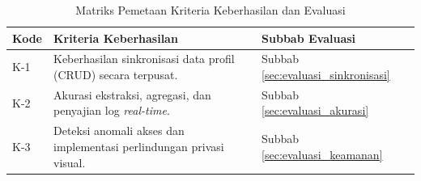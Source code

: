 \begin{table}[t]
\centering
\caption{Matriks Pemetaan Kriteria Keberhasilan dan Evaluasi}
\label{tab:mapping_success}
\begin{tabular}{|l|p{8cm}|l|}
\hline
\textbf{Kode} & \textbf{Kriteria Keberhasilan} & \textbf{Subbab Evaluasi} \\ \hline
K-1 & Keberhasilan sinkronisasi data profil (CRUD) secara terpusat. & Subbab \ref{sec:evaluasi_sinkronisasi} \\ \hline
K-2 & Akurasi ekstraksi, agregasi, dan penyajian log \textit{real-time}. & Subbab \ref{sec:evaluasi_akurasi} \\ \hline
K-3 & Deteksi anomali akses dan implementasi perlindungan privasi visual. & Subbab \ref{sec:evaluasi_keamanan} \\ \hline
\end{tabular}
\end{table}